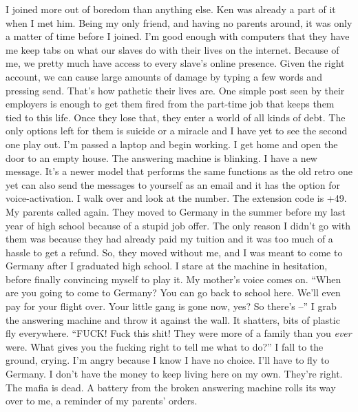 \documentclass[a4paper, 12pt]{book}
\begin{document}
\newline
\tab
I joined more out of boredom than anything else. Ken was already a part of it when I met him. Being my only friend, and having no parents around, it was only a matter of time before I joined. I’m good enough with computers that they have me keep tabs on what our slaves do with their lives on the internet. Because of me, we pretty much have access to every slave’s online presence. Given the right account, we can cause large amounts of damage by typing a few words and pressing send. That’s how pathetic their lives are. One simple post seen by their employers is enough to get them fired from the part-time job that keeps them tied to this life. Once they lose that, they enter a world of all kinds of debt. The only options left for them is suicide or a miracle and I have yet to see the second one play out. I’m passed a laptop and begin working.
\newline\newline\newline
\tab
I get home and open the door to an empty house. The answering machine is blinking. I have a new message. It’s a newer model that performs the same functions as the old retro one yet can also send the messages to yourself as an email and it has the option for voice-activation. I walk over and look at the number. The extension code is +49. My parents called again. They moved to Germany in the summer before my last year of high school because of a stupid job offer. The only reason I didn’t go with them was because they had already paid my tuition and it was too much of a hassle to get a refund. So, they moved without me, and I was meant to come to Germany after I graduated high school.
\newline
\tab
I stare at the machine in hesitation, before finally convincing myself to play it. My mother’s voice comes on. ``When are you going to come to Germany? You can go back to school here. We’ll even pay for your flight over. Your little gang is gone now, yes? So there’s --'' I grab the answering machine and throw it against the wall. It shatters, bits of plastic fly everywhere.
\newline
\tab
``FUCK! Fuck this shit! They were more of a family than you \textit{ever} were. What gives you the fucking right to tell me what to do?'' I fall to the ground, crying. I’m angry because I know I have no choice. I’ll have to fly to Germany. I don’t have the money to keep living here on my own. They’re right. The mafia is dead. A battery from the broken answering machine rolls its way over to me, a reminder of my parents’ orders.
\end{document}
